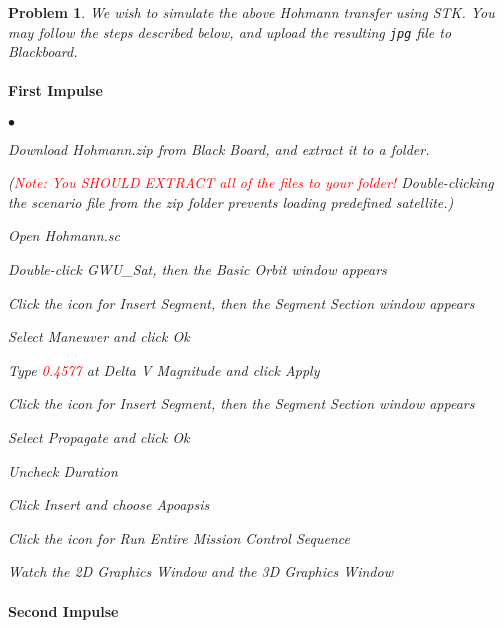 \documentclass[10pt]{article}
\theoremstyle{plain}\theorembodyfont{\normalfont}
\newtheorem{prob}{Problem}[section]
\begin{document}
\begin{prob}
We wish to simulate the above Hohmann transfer using STK. You may follow the steps described below, and upload the resulting \texttt{jpg} file to Blackboard. 

\paragraph{First Impulse}

\begin{list}{$\bullet$}
{\setlength{\itemsep}{-3pt}\setlength{\leftmargin}{30pt}}
\item Download \emph{Hohmann.zip} from Black Board, and extract it to a folder.

(\textcolor{red}{Note: You SHOULD EXTRACT all of the files to your folder!} Double-clicking the scenario file from the zip folder prevents loading predefined satellite.)

\item Open \emph{Hohmann.sc}
\item Double-click \emph{GWU\_Sat}, then the \emph{Basic Orbit} window appears
\item Click the icon for \emph{Insert Segment}, then the \emph{Segment Section} window appears
\item Select \emph{Maneuver} and click \emph{Ok}
\item Type \textcolor{red}{\emph{0.4577}} at \emph{Delta V Magnitude} and click \emph{Apply}
\item Click the icon for \emph{Insert Segment}, then the \emph{Segment Section} window appears
\item Select \emph{Propagate} and click \emph{Ok}
\item Uncheck \emph{Duration}
\item Click \emph{Insert} and choose \emph{Apoapsis}
\item Click the icon for \emph{Run Entire Mission Control Sequence}
\item Watch the \emph{2D Graphics Window} and the \emph{3D Graphics Window}
\end{list}

\paragraph{Second Impulse}


\end{prob}
\end{document}

